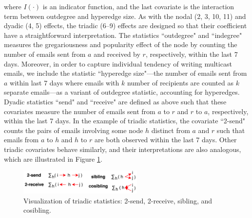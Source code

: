 \documentclass[ba]{imsart}
\numberwithin{equation}{section}
\theoremstyle{plain}
\begin{document}
 	   where $I(\cdot)$ is an indicator function, and the last covariate is the interaction term between outdegree and hyperedge size. As with the nodal (2, 3, 10, 11) and dyadic (4, 5) effects, the triadic (6--9) effects are designed so that their coefficient have a straightforward interpretation. The statistics ``outdegree" and ``indegree" measures the gregariousness and popularity effect of the node by counting the number of emails sent from $a$ and received by $r$, respectively, within the last 7 days. Moreover, in order to capture individual tendency of writing multicast emails, we include the statistic ``hyperedge size"---the number of emails sent from $a$ within last 7 days where emails with $k$ number of recipients are counted as $k$ separate emails---as a variant of outdegree statistic, accounting for hyperedges. Dyadic statistics ``send" and ``receive" are defined as above such that these covariates measure the number of emails sent from $a$ to $r$ and $r$ to $a$, respectively, within the last 7 days. In the example of triadic statistics, the covariate ``2-send" counts the pairs of emails involving some node $h$ distinct from $a$ and $r$ such that emails from $a$ to $h$ and $h$ to $r$ are both observed within the last 7 days. Other triadic covariates behave similarly, and their interpretations are also analogous, which are illustrated in Figure \ref{figure:netstats}.
 	   \begin{figure}[!t]
 	   	\centering
 	   	\includegraphics[width=0.55\textwidth]{img/triad.png}	
 	   	\caption {Visualization of triadic statistics: 2-send, 2-receive, sibling, and cosibling.}
 	   	\label{figure:netstats}
 	   \end{figure}
 	   
\end{document}
